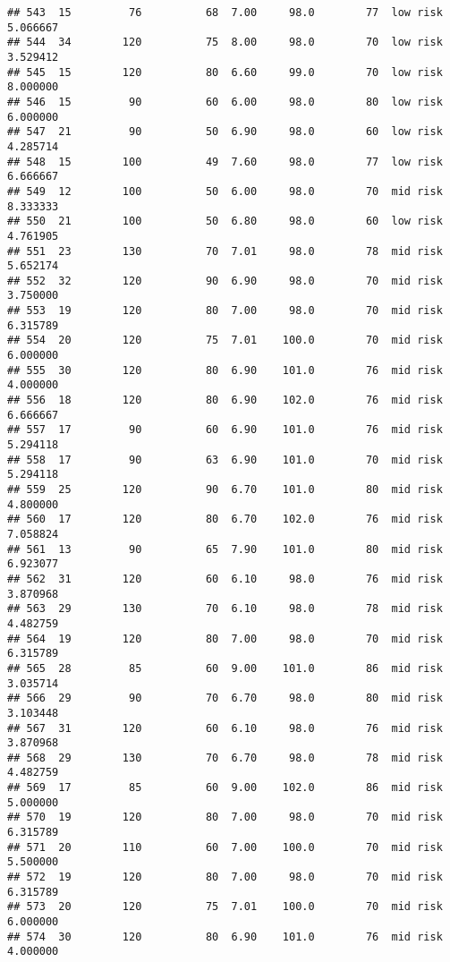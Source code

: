 \documentclass[
  ignorenonframetext,
]{beamer}
\begin{document}
\begin{frame}[fragile]
\begin{verbatim}
## 543  15         76          68  7.00     98.0        77  low risk      5.066667
## 544  34        120          75  8.00     98.0        70  low risk      3.529412
## 545  15        120          80  6.60     99.0        70  low risk      8.000000
## 546  15         90          60  6.00     98.0        80  low risk      6.000000
## 547  21         90          50  6.90     98.0        60  low risk      4.285714
## 548  15        100          49  7.60     98.0        77  low risk      6.666667
## 549  12        100          50  6.00     98.0        70  mid risk      8.333333
## 550  21        100          50  6.80     98.0        60  low risk      4.761905
## 551  23        130          70  7.01     98.0        78  mid risk      5.652174
## 552  32        120          90  6.90     98.0        70  mid risk      3.750000
## 553  19        120          80  7.00     98.0        70  mid risk      6.315789
## 554  20        120          75  7.01    100.0        70  mid risk      6.000000
## 555  30        120          80  6.90    101.0        76  mid risk      4.000000
## 556  18        120          80  6.90    102.0        76  mid risk      6.666667
## 557  17         90          60  6.90    101.0        76  mid risk      5.294118
## 558  17         90          63  6.90    101.0        70  mid risk      5.294118
## 559  25        120          90  6.70    101.0        80  mid risk      4.800000
## 560  17        120          80  6.70    102.0        76  mid risk      7.058824
## 561  13         90          65  7.90    101.0        80  mid risk      6.923077
## 562  31        120          60  6.10     98.0        76  mid risk      3.870968
## 563  29        130          70  6.10     98.0        78  mid risk      4.482759
## 564  19        120          80  7.00     98.0        70  mid risk      6.315789
## 565  28         85          60  9.00    101.0        86  mid risk      3.035714
## 566  29         90          70  6.70     98.0        80  mid risk      3.103448
## 567  31        120          60  6.10     98.0        76  mid risk      3.870968
## 568  29        130          70  6.70     98.0        78  mid risk      4.482759
## 569  17         85          60  9.00    102.0        86  mid risk      5.000000
## 570  19        120          80  7.00     98.0        70  mid risk      6.315789
## 571  20        110          60  7.00    100.0        70  mid risk      5.500000
## 572  19        120          80  7.00     98.0        70  mid risk      6.315789
## 573  20        120          75  7.01    100.0        70  mid risk      6.000000
## 574  30        120          80  6.90    101.0        76  mid risk      4.000000

\end{verbatim}
\end{frame}
\end{document}
